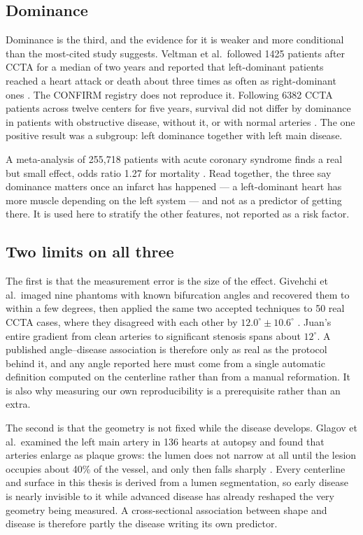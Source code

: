 \subsection{Dominance}

Dominance is the third, and the evidence for it is weaker and more conditional than the most-cited
study suggests.
Veltman et al.\ followed 1425 patients after CCTA for a median of two years and reported that
left-dominant patients reached a heart attack or death about three times as often as right-dominant
ones \cite{veltman2012dominance}.
The CONFIRM registry does not reproduce it.
Following 6382 CCTA patients across twelve centers for five years, survival did not differ by
dominance in patients with obstructive disease, without it, or with normal arteries
\cite{gebhard2015dominance}.
The one positive result was a subgroup: left dominance together with left main disease.

A meta-analysis of 255,718 patients with acute coronary syndrome finds a real but small effect,
odds ratio 1.27 for mortality \cite{khan2016dominance}.
Read together, the three say dominance matters once an infarct has happened --- a left-dominant
heart has more muscle depending on the left system --- and not as a predictor of getting there. It is
used here to stratify the other features, not reported as a risk factor.

\subsection{Two limits on all three}

The first is that the measurement error is the size of the effect.
Givehchi et al.\ imaged nine phantoms with known bifurcation angles and recovered them to within a
few degrees, then applied the same two accepted techniques to 50 real CCTA cases, where they
disagreed with each other by $12.0^\circ \pm 10.6^\circ$ \cite{givehchi2018phantom}.
Juan's entire gradient from clean arteries to significant stenosis spans about $12^\circ$.
A published angle--disease association is therefore only as real as the protocol behind it, and any
angle reported here must come from a single automatic definition computed on the centerline rather
than from a manual reformation.
It is also why measuring our own reproducibility is a prerequisite rather than an extra.

The second is that the geometry is not fixed while the disease develops.
Glagov et al.\ examined the left main artery in 136 hearts at autopsy and found that arteries enlarge
as plaque grows: the lumen does not narrow at all until the lesion occupies about 40\% of the vessel,
and only then falls sharply \cite{glagov1987remodeling}.
Every centerline and surface in this thesis is derived from a lumen segmentation, so early disease is
nearly invisible to it while advanced disease has already reshaped the very geometry being measured.
A cross-sectional association between shape and disease is therefore partly the disease writing its
own predictor.
